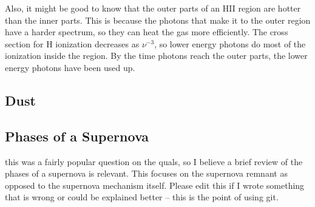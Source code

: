 Also, it might be good to know that the outer parts of an HII region are hotter than the inner 
parts.  This is because the photons that make it to the outer region have a harder spectrum, so 
they can heat the gas more efficiently.  The cross section for H ionization decreases as 
$\nu^{-3}$, so lower energy photons do most of the ionization inside the region.  By the time 
photons reach the outer parts, the lower energy photons have been used up.  

\subsection{Dust}

\subsection{Phases of a Supernova}
 this was a fairly popular question on the quals, so
I believe a brief review of the phases of a supernova is relevant.  This focuses on the
supernova remnant as opposed to the supernova mechanism itself.  Please edit this if I wrote
something that is wrong or could be explained better -- this is the point of using git.
